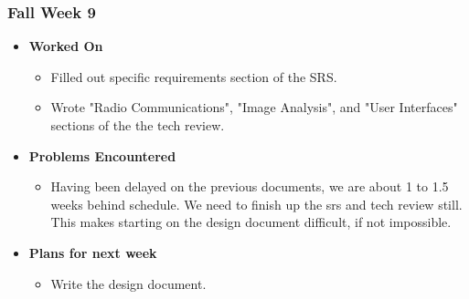 \documentclass[compsoc,draftclsnofoot,onecolumn,10pt]{IEEEtran}
\begin{document}
\subsubsection{Fall Week 9}
\begin{itemize}
    \item {\textbf{Worked On}}
    \begin{itemize}
        \item Filled out specific requirements section of the SRS.
        \item Wrote "Radio Communications", "Image Analysis", and "User Interfaces" sections of the the tech review.
    \end{itemize}

    \item {\textbf{Problems Encountered}}
    \begin{itemize}
        \item Having been delayed on the previous documents, we are about 1 to 1.5 weeks behind schedule. We need to finish up the srs and tech review still. This makes starting on the design document difficult, if not impossible.
    \end{itemize}

    \item{\textbf{Plans for next week}}
    \begin{itemize}
        \item Write the design document.
    \end{itemize}

\end{itemize}
\end{document}
